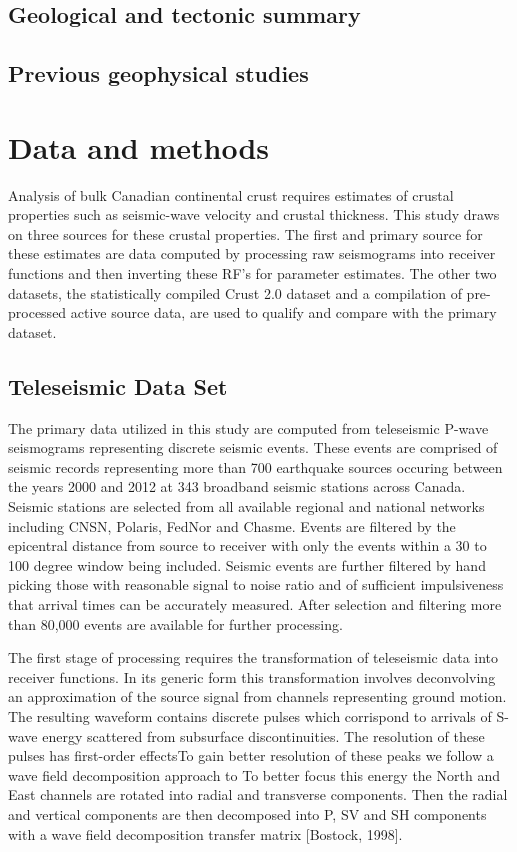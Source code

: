\documentclass[draft, 12pt]{article}
\begin{document}
\subsection{Geological and tectonic summary}


\subsection{Previous geophysical studies}

\section{Data and methods}
  Analysis of bulk Canadian continental crust requires estimates of crustal properties such as seismic-wave velocity and crustal thickness. This study draws on three sources for these crustal properties. The first and primary source for these estimates are data computed by processing raw seismograms into receiver functions and then inverting these RF's for parameter estimates. The other two datasets, the statistically compiled Crust 2.0 dataset and a compilation of pre-processed active source data, are used to qualify and compare with the primary dataset.

\subsection{Teleseismic Data Set}

  The primary data utilized in this study are computed from teleseismic P-wave seismograms representing discrete seismic events. These events are comprised of seismic records representing more than 700 earthquake sources occuring between the years 2000 and 2012 at 343 broadband seismic stations across Canada. Seismic stations are selected from all available regional and national networks including CNSN, Polaris, FedNor and Chasme. Events are filtered by the epicentral distance from source to receiver with only the events within a 30 to 100 degree window being included. Seismic events are further filtered by hand picking those with reasonable signal to noise ratio and of sufficient impulsiveness that arrival times can be accurately measured. After selection and filtering more than 80,000 events are available for further processing.

  The first stage of processing requires the transformation of teleseismic data into receiver functions. In its generic form this transformation involves deconvolving an approximation of the source signal from channels representing ground motion. The resulting waveform contains discrete pulses which corrispond to arrivals of S-wave energy scattered from subsurface discontinuities. The resolution of these pulses has first-order effectsTo gain better resolution of these peaks we follow a wave field decomposition approach to To better focus this energy the North and East channels are rotated into radial and transverse components. Then the radial and vertical components are then decomposed into P, SV and SH components with a wave field decomposition transfer matrix [Bostock, 1998].
\end{document}
